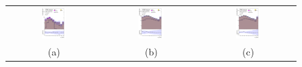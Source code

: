 \documentclass[PAPER, coverpage, atlasdraft=true, texlive=2016, UKenglish]{\ATLASLATEXPATH atlasdoc}
\begin{document}
\begin{figure}[H]
\centering
\begin{tabular}{@{}ccc@{}}
\includegraphics[page=1,width=0.28\textwidth]{figures/mtt/tuH_reg1l2tau1bnj_os_log_mtt.pdf} &
\includegraphics[page=1,width=0.28\textwidth]{figures/mtt/tuH_reg1l1tau1b1j_ss_log_mtt.pdf}&
\includegraphics[page=1,width=0.28\textwidth]{figures/mtt/tuH_reg1l1tau1b2j_ss_log_mtt.pdf}\\
(a) & (b) & (c) \\

\end{tabular}
\end{figure}
\end{document}
